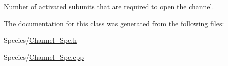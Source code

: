 Number of activated subunits that are required to open the channel. 



The documentation for this class was generated from the following files\+:\begin{DoxyCompactItemize}
\item 
Species/\hyperlink{_channel___spc_8h}{Channel\+\_\+\+Spc.\+h}\item 
Species/\hyperlink{_channel___spc_8cpp}{Channel\+\_\+\+Spc.\+cpp}\end{DoxyCompactItemize}
